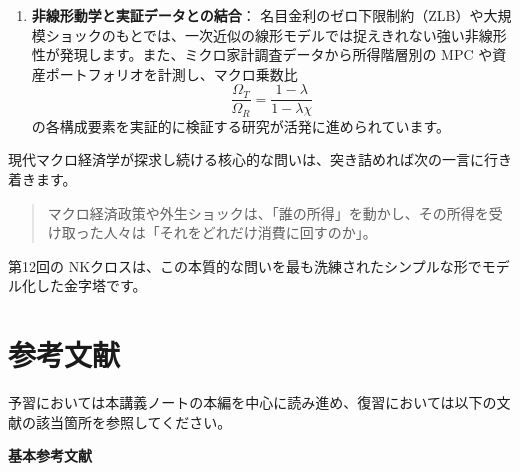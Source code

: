 \documentclass[
  japanese,
  lualatex,
  ja=standard,
  12pt,
  a4paper]{ltjsarticle}
\providecommand{\tightlist}{%
  \setlength{\itemsep}{0pt}\setlength{\parskip}{0pt}}
\begin{document}
\begin{enumerate}
\def\labelenumi{\arabic{enumi}.}
\setcounter{enumi}{2}
\tightlist
\item
  \textbf{非線形動学と実証データとの結合}：
  名目金利のゼロ下限制約（ZLB）や大規模ショックのもとでは、一次近似の線形モデルでは捉えきれない強い非線形性が発現します。また、ミクロ家計調査データから所得階層別の
  MPC や資産ポートフォリオを計測し、マクロ乗数比 \[
  \frac{\Omega_T}{\Omega_R} = \frac{1-\lambda}{1-\lambda\chi}
  \] の各構成要素を実証的に検証する研究が活発に進められています。
\end{enumerate}

現代マクロ経済学が探求し続ける核心的な問いは、突き詰めれば次の一言に行き着きます。

\begin{quote}
マクロ経済政策や外生ショックは、「誰の所得」を動かし、その所得を受け取った人々は「それをどれだけ消費に回すのか」。
\end{quote}

第12回の
NKクロスは、この本質的な問いを最も洗練されたシンプルな形でモデル化した金字塔です。


\section{参考文献}\label{ux53c2ux8003ux6587ux732e}

予習においては本講義ノートの本編を中心に読み進め、復習においては以下の文献の該当箇所を参照してください。

\textbf{基本参考文献}
\end{document}
